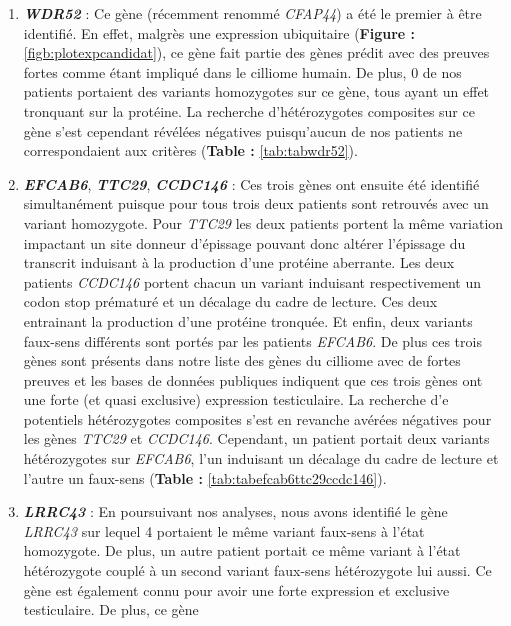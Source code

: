 \documentclass[12pt,twoside]{reedthesis}
\theoremstyle{definition}
\theoremstyle{definition}
\theoremstyle{remark}
\begin{document}
  \begin{enumerate}
  \def\labelenumi{\arabic{enumi}.}
  \item
    \textbf{\emph{WDR52}} : Ce gène (récemment renommé \emph{CFAP44}) a
    été le premier à être identifié. En effet, malgrès une expression
    ubiquitaire (\textbf{Figure : }\ref{figb:plotexpcandidat}), ce gène
    fait partie des gènes prédit avec des preuves fortes comme étant
    impliqué dans le cilliome humain. De plus, 0 de nos patients portaient
    des variants homozygotes sur ce gène, tous ayant un effet tronquant
    sur la protéine. La recherche d'hétérozygotes composites sur ce gène
    s'est cependant révélées négatives puisqu'aucun de nos patients ne
    correspondaient aux critères (\textbf{Table : }\ref{tab:tabwdr52}).
  \item
    \textbf{\emph{EFCAB6}}, \textbf{\emph{TTC29}}, \textbf{\emph{CCDC146}}
    : Ces trois gènes ont ensuite été identifié simultanément puisque pour
    tous trois deux patients sont retrouvés avec un variant homozygote.
    Pour \emph{TTC29} les deux patients portent la même variation
    impactant un site donneur d'épissage pouvant donc altérer l'épissage
    du transcrit induisant à la production d'une protéine aberrante. Les
    deux patients \emph{CCDC146} portent chacun un variant induisant
    respectivement un codon stop prématuré et un décalage du cadre de
    lecture. Ces deux entrainant la production d'une protéine tronquée. Et
    enfin, deux variants faux-sens différents sont portés par les patients
    \emph{EFCAB6}. De plus ces trois gènes sont présents dans notre liste
    des gènes du cilliome avec de fortes preuves et les bases de données
    publiques indiquent que ces trois gènes ont une forte (et quasi
    exclusive) expression testiculaire. La recherche d'e potentiels
    hétérozygotes composites s'est en revanche avérées négatives pour les
    gènes \emph{TTC29} et \emph{CCDC146}. Cependant, un patient portait
    deux variants hétérozygotes sur \emph{EFCAB6}, l'un induisant un
    décalage du cadre de lecture et l'autre un faux-sens (\textbf{Table :
    }\ref{tab:tabefcab6ttc29ccdc146}). \newpage
  \item
    \textbf{\emph{LRRC43}} : En poursuivant nos analyses, nous avons
    identifié le gène \emph{LRRC43} sur lequel 4 portaient le même variant
    faux-sens à l'état homozygote. De plus, un autre patient portait ce
    même variant à l'état hétérozygote couplé à un second variant
    faux-sens hétérozygote lui aussi. Ce gène est également connu pour
    avoir une forte expression et exclusive testiculaire. De plus, ce gène

\end{enumerate}
\end{document}
